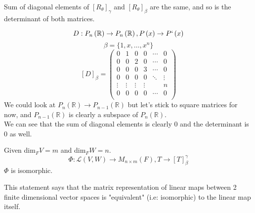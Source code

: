 \documentclass[11pt,a4paper]{colorart}
\def\l{\left}
\def\r{\right}
\def\R{\mathbb{R}}
\def\b{\beta}
\def\g{\gamma}
\def\L{\mathcal{L}}
\begin{document}
\begin{remark}
	Sum of diagonal elements of $\l[R_\theta\r]_\g$ and $\l[R_\theta\r]_\b$ are the same, and so is the determinant of both matrices. 
\end{remark}

\begin{example}
	\[ D:P_n\l(\R\r) \rightarrow P_n\l(\R\r), P\l(x\r) \rightarrow P`\l(x\r) \]
	\[ \b = \{1,x,\dots,x^n\} \]
	\[ \l[D\r]_\b  = \begin{pmatrix} 
	   0 & 1 & 0 & 0 & \cdots & 0\\
	   0 & 0 & 2 & 0 & \cdots & 0\\
	   0 & 0 & 0 & 3 & \cdots & 0\\
	   0 & 0 & 0 & 0 & \ddots & \vdots\\
	   \vdots & \vdots & \vdots & \vdots &  & n\\
	   0 & 0 & 0 & 0 & \cdots & 0\\
	   \end{pmatrix}\]  
We could look at  $P_n\l(\R\r) \rightarrow P_{n-1}\l(\R\r)$ but let's stick to square matrices for now, and $P_{n-1}\l(\R\r)$ is clearly a subspace of $P_n\l(\R\r)$. \\

We can see that the sum of diagonal elements is clearly 0 and the determinant is 0 as well.

\end{example}

\begin{proposition}
	Given dim$_FV=m$ and dim$_FW=n$.
	\[ \Phi: \L\l(V,W\r) \rightarrow M_{n\times m}\l(F\r), T\rightarrow \l[T\r]_\b^\g   \]
	$\Phi$ is isomorphic.
\end{proposition}

	\begin{remark}
		This statement says that the matrix representation of linear maps between 2 finite dimensional vector spaces is "equivalent" (i.e: isomorphic) to the linear map itself.
	\end{remark}
\end{document}

